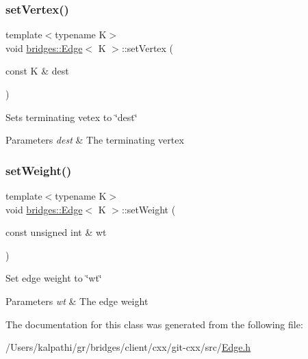 \subsubsection{\texorpdfstring{set\+Vertex()}{setVertex()}}
{\footnotesize\ttfamily template$<$typename K$>$ \\
void \hyperlink{classbridges_1_1_edge}{bridges\+::\+Edge}$<$ K $>$\+::set\+Vertex (\begin{DoxyParamCaption}\item[{const K \&}]{dest }\end{DoxyParamCaption})\hspace{0.3cm}{\ttfamily [inline]}}

Sets terminating vetex to \char`\"{}dest\char`\"{}


\begin{DoxyParams}{Parameters}
{\em dest} & The terminating vertex \\
\hline
\end{DoxyParams}
\hypertarget{classbridges_1_1_edge_ad087fc6e5f669102a15147cb6b9c1025}{}\label{classbridges_1_1_edge_ad087fc6e5f669102a15147cb6b9c1025} 
\subsubsection{\texorpdfstring{set\+Weight()}{setWeight()}}
{\footnotesize\ttfamily template$<$typename K$>$ \\
void \hyperlink{classbridges_1_1_edge}{bridges\+::\+Edge}$<$ K $>$\+::set\+Weight (\begin{DoxyParamCaption}\item[{const unsigned int \&}]{wt }\end{DoxyParamCaption})\hspace{0.3cm}{\ttfamily [inline]}}

Set edge weight to \char`\"{}wt\char`\"{}


\begin{DoxyParams}{Parameters}
{\em wt} & The edge weight \\
\hline
\end{DoxyParams}


The documentation for this class was generated from the following file\+:\begin{DoxyCompactItemize}
\item 
/\+Users/kalpathi/gr/bridges/client/cxx/git-\/cxx/src/\hyperlink{_edge_8h}{Edge.\+h}\end{DoxyCompactItemize}
